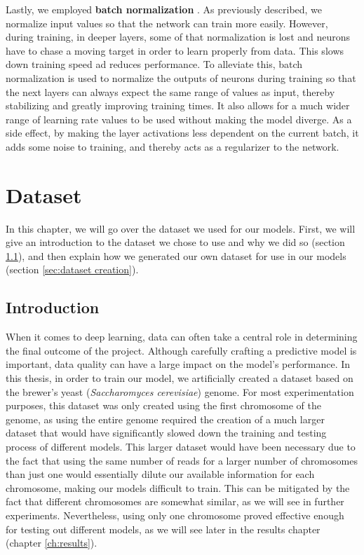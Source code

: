 \documentclass[times, utf8, diplomski, english]{fer_eng}
\begin{document}
Lastly, we employed \textbf{batch normalization} \cite{bn}. As previously described, we normalize input values so that the network can train more easily. However, during training, in deeper layers, some of that normalization is lost and neurons have to chase a moving target in order to learn properly from data. This slows down training speed ad reduces performance. To alleviate this, batch normalization is used to normalize the outputs of neurons during training so that the next layers can always expect the same range of values as input, thereby stabilizing and greatly improving training times. It also allows for a much wider range of learning rate values to be used without making the model diverge. As a side effect, by making the layer activations less dependent on the current batch, it adds some noise to training, and thereby acts as a regularizer to the network.

\chapter{Dataset}
\label{ch:dataset}

In this chapter, we will go over the dataset we used for our models. First, we will give an introduction to the dataset we chose to use and why we did so (section \ref{sec:introduction}), and then explain how we generated our own dataset for use in our models (section \ref{sec:dataset creation}).

\section{Introduction}
\label{sec:introduction}

When it comes to deep learning, data can often take a central role in determining the final outcome of the project. Although carefully crafting a predictive model is important, data quality can have a large impact on the model's performance. In this thesis, in order to train our model, we artificially created a dataset based on the brewer's yeast (\textit{Saccharomyces cerevisiae}) genome. For most experimentation purposes, this dataset was only created using the first chromosome of the genome, as using the entire genome required the creation of a much larger dataset that would have significantly slowed down the training and testing process of different models. This larger dataset would have been necessary due to the fact that using the same number of reads for a larger number of chromosomes than just one would essentially dilute our available information for each chromosome, making our models difficult to train. This can be mitigated by the fact that different chromosomes are somewhat similar, as we will see in further experiments. Nevertheless, using only one chromosome proved effective enough for testing out different models, as we will see later in the results chapter (chapter \ref{ch:results}).
\end{document}
